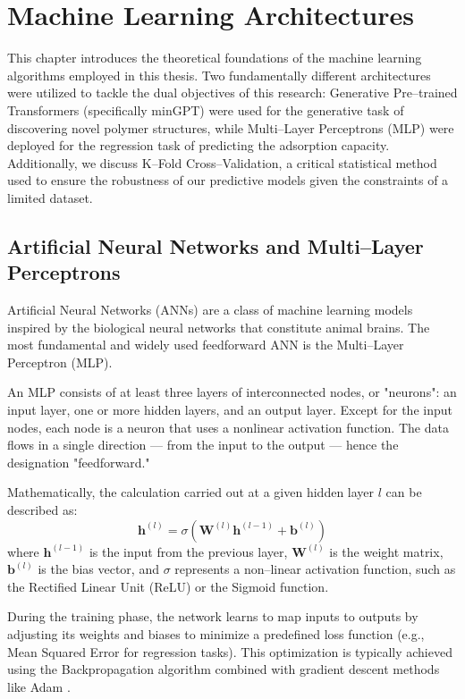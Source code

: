 \chapter{Machine Learning Architectures}
\label{chap2}

This chapter introduces the theoretical foundations of the machine learning algorithms employed in this thesis. Two fundamentally different architectures were utilized to tackle the dual objectives of this research: Generative Pre--trained Transformers (specifically minGPT) were used for the generative task of discovering novel polymer structures, while Multi--Layer Perceptrons (MLP) were deployed for the regression task of predicting the adsorption capacity. Additionally, we discuss K--Fold Cross--Validation, a critical statistical method used to ensure the robustness of our predictive models given the constraints of a limited dataset.

\section{Artificial Neural Networks and Multi--Layer Perceptrons}
\label{sec:mlp}

Artificial Neural Networks (ANNs) are a class of machine learning models inspired by the biological neural networks that constitute animal brains. The most fundamental and widely used feedforward ANN is the Multi--Layer Perceptron (MLP).

An MLP consists of at least three layers of interconnected nodes, or "neurons": an input layer, one or more hidden layers, and an output layer.  Except for the input nodes, each node is a neuron that uses a nonlinear activation function. The data flows in a single direction — from the input to the output — hence the designation "feedforward."

Mathematically, the calculation carried out at a given hidden layer $l$ can be described as:
\begin{equation}
	\mathbf{h}^{(l)} = \sigma \left( \mathbf{W}^{(l)} \mathbf{h}^{(l-1)} + \mathbf{b}^{(l)} \right)
\end{equation}
where $\mathbf{h}^{(l-1)}$ is the input from the previous layer, $\mathbf{W}^{(l)}$ is the weight matrix, $\mathbf{b}^{(l)}$ is the bias vector, and $\sigma$ represents a non--linear activation function, such as the Rectified Linear Unit (ReLU) or the Sigmoid function.

During the training phase, the network learns to map inputs to outputs by adjusting its weights and biases to minimize a predefined loss function (e.g., Mean Squared Error for regression tasks). This optimization is typically achieved using the Backpropagation algorithm combined with gradient descent methods like Adam \cite{kingma2014adam}.

